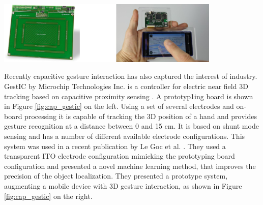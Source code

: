\begin{minipage}{\linewidth}
\centering
\includegraphics[width=0.8\textwidth]{images/cap_gestic}
\label{fig:cap_gestic}
\end{minipage}

Recently capacitive gesture interaction has also captured the interest of industry. GestIC by Microchip Technologies Inc. is a controller for electric near field 3D tracking based on capacitive proximity sensing \cite{microchip2013}. A prototyp1ing board is shown in Figure \ref{fig:cap_gestic} on the left. Using a set of several electrodes and on-board processing it is capable of tracking the 3D position of a hand and provides gesture recognition at a distance between 0 and 15 cm. It is based on shunt mode sensing and has a number of different available electrode configurations. This system was used in a recent publication by Le Goc et al. \cite{le2014low}. They used a transparent ITO electrode configuration mimicking the prototyping board configuration and presented a novel machine learning method, that improves the precision of the object localization. They presented a prototype system, augmenting a mobile device with 3D gesture interaction, as shown in Figure \ref{fig:cap_gestic} on the right.


